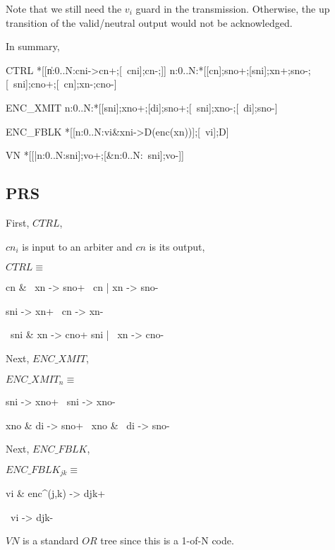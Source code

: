 \documentclass[aer.tex]{subfiles}
\begin{document}
\noindent Note that we still need the $v_i$ guard in the transmission. Otherwise, the up transition of the valid/neutral output would not be acknowledged.

In summary,

\begin{hse}
CTRL\equiv
*[[\langle\|n:0..N:cni->cn+;[~cni];cn-;\rangle]] \pll
\langle\pll\!n:0..N:*[[cn];sno+;[sni];xn+;sno-;[~sni];cno+;[~cn];xn-;cno-]\rangle
\end{hse}

\begin{hse}
ENC_XMIT\equiv
\langle\pll\!n:0..N:*[[sni];xno+;[di];sno+;[~sni];xno-;[~di];sno-]\rangle
\end{hse}

\begin{hse}
ENC_FBLK\equiv
*[[\langle[]n:0..N:vi&xni->D(enc(xn))\Uparrow\rangle];[~vi];D\Downarrow]

VN\equiv
*[[\langle|n:0..N:sni\rangle];vo+;[\langle&n:0..N:~sni\rangle];vo-]]
\end{hse}

\subsection{PRS}

First, $CTRL$,

$cn_i$ is input to an arbiter and $cn$ is its output,

$CTRL\equiv$
\begin{prs2}
cn & ~xn -> sno+
~cn | xn -> sno-

sni -> xn+
~cn -> xn-

~sni & xn -> cno+
sni | ~xn -> cno-
\end{prs2}

Next, $ENC\_XMIT$,

$ENC\_XMIT_n\equiv$
\begin{prs2}
sni -> xno+
~sni -> xno-

xno & di -> sno+
~xno & ~di -> sno-
\end{prs2}

Next, $ENC\_FBLK$,

$ENC\_FBLK_{jk}\equiv$
\begin{prs2}
vi & enc^{}(j,k) -> djk+

~vi -> djk-
\end{prs2}

$VN$ is a standard $OR$ tree since this is a 1-of-N code.
\end{document}
